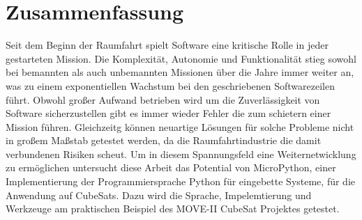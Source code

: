 \cleardoublepage
\section*{Zusammenfassung}

Seit dem Beginn der Raumfahrt spielt Software eine kritische Rolle in jeder gestarteten Mission. Die Komplexität, Autonomie und Funktionalität stieg sowohl bei bemannten als auch unbemannten Missionen über die Jahre immer weiter an, was zu einem exponentiellen Wachstum bei den geschriebenen Softwarezeilen führt.
Obwohl großer Aufwand betrieben wird um die Zuverlässigkeit von Software sicherzustellen gibt es immer wieder Fehler die zum schietern einer Mission führen. Gleichzeitg können neuartige Lösungen für solche Probleme nicht in großem Maßstab getestet werden, da die Raumfahrtindustrie die damit verbundenen Risiken scheut.
Um in diesem Spannungsfeld eine Weiternetwicklung zu ermöglichen untersucht diese Arbeit das Potential von MicroPython, einer Implementierung der Programmiersprache Python für eingebette Systeme, für die Anwendung auf CubeSats. Dazu wird die Sprache, Impelemtierung und Werkzeuge am praktischen Beispiel des MOVE-II CubeSat Projektes getestet.
